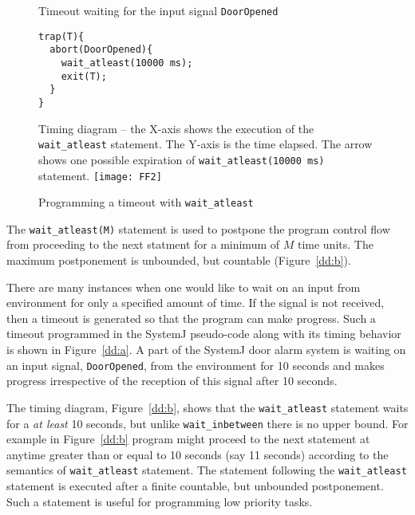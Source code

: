 \begin{figure}[b!]
	\centering
	\vspace{-10pt}
        \begin{SubFloat}{\label{dd:a}Timeout waiting for the input
            signal \texttt{DoorOpened}}
						\begin{minipage}{0.4\textwidth}
        \begin{lstlisting}[style=sysj,morekeywords={abort,await,emit,present,trap,pause,exit,wait_atleast,suspend}]
trap(T){
  abort(DoorOpened){
    wait_atleast(10000 ms);
    exit(T);  
  }
}
\end{lstlisting}
\end{minipage}
\end{SubFloat}

\begin{SubFloat}{\label{dd:b}Timing diagram -- the X-axis shows the
    execution of the \texttt{wait\_atleast} statement. The Y-axis is the
    time elapsed. The arrow shows one possible expiration of
    \texttt{wait\_atleast(10000 ms)} statement.}
\texttt{[image: FF2]}
\end{SubFloat}
\caption{Programming a timeout with \texttt{wait\_atleast}}
\label{dd}
\end{figure}

The \texttt{wait\_atleast(M)} statement is used to postpone the program
control flow from proceeding to the next statment for a minimum of $M$
time units. The maximum postponement is unbounded, but countable
(Figure~\ref{dd:b}).

There are many instances when one would like to wait on an input from
environment for only a specified amount of time. If the signal is not
received, then a timeout is generated so that the program can make
progress. Such a timeout programmed in the SystemJ pseudo-code along
with its timing behavior is shown in Figure~\ref{dd:a}. A part of the
SystemJ door alarm system is waiting on an input signal,
\texttt{DoorOpened}, from the environment for 10 seconds and makes
progress irrespective of the reception of this signal after 10 seconds.

The timing diagram, Figure~\ref{dd:b}, shows that the
\texttt{wait\-\_atleast} statement waits for a \textit{at least} 10
seconds, but unlike \texttt{wait\_inbetween} there is no upper bound.
For example in Figure~\ref{dd:b} program might proceed to the next
statement at anytime greater than or equal to 10 seconds (say 11
seconds) according to the semantics of \texttt{wait\_atleast}
statement. The statement following the \texttt{wait\_atleast} statement
is executed after a finite countable, but unbounded postponement. Such a
statement is useful for programming low priority tasks.


